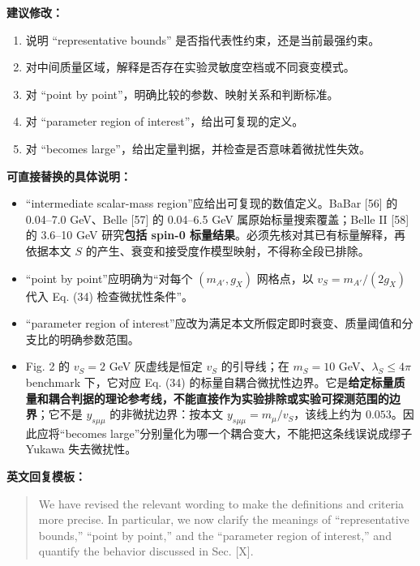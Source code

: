 \documentclass[
  chinese,
  UTF8]{ctexart}
\providecommand{\tightlist}{%
  \setlength{\itemsep}{0pt}\setlength{\parskip}{0pt}}
\begin{document}
\textbf{建议修改：}

\begin{enumerate}
\def\labelenumi{\arabic{enumi}.}
\tightlist
\item
  说明 ``representative bounds'' 是否指代表性约束，还是当前最强约束。
\item
  对中间质量区域，解释是否存在实验灵敏度空档或不同衰变模式。
\item
  对 ``point by point''，明确比较的参数、映射关系和判断标准。
\item
  对 ``parameter region of interest''，给出可复现的定义。
\item
  对 ``becomes large''，给出定量判据，并检查是否意味着微扰性失效。
\end{enumerate}

\textbf{可直接替换的具体说明：}

\begin{itemize}
\tightlist
\item
  ``intermediate scalar-mass region''应给出可复现的数值定义。BaBar
  {[}56{]} 的 0.04--7.0 GeV、Belle {[}57{]} 的 0.04--6.5 GeV
  属原始标量搜索覆盖；Belle II {[}58{]} 的 3.6--10 GeV 研究\textbf{包括
  spin-0 标量结果}。必须先核对其已有标量解释，再依据本文 \(S\)
  的产生、衰变和接受度作模型映射，不得称全段已排除。
\item
  ``point by point''应明确为``对每个 \((m_{A'},g_X)\) 网格点，以
  \(v_S=m_{A'}/(2g_X)\) 代入 Eq. (34) 检查微扰性条件''。
\item
  ``parameter region of
  interest''应改为满足本文所假定即时衰变、质量阈值和分支比的明确参数范围。
\item
  Fig. 2 的 \(v_S=2\) GeV 灰虚线是恒定 \(v_S\) 的引导线；在 \(m_S=10\)
  GeV、\(\lambda_S\le4\pi\) benchmark 下，它对应 Eq. (34)
  的标量自耦合微扰性边界。它是\textbf{给定标量质量和耦合判据的理论参考线，不能直接作为实验排除或实验可探测范围的边界}；它不是
  \(y_{s\mu\mu}\) 的非微扰边界：按本文
  \(y_{s\mu\mu}=m_\mu/v_S\)，该线上约为 \(0.053\)。因此应将``becomes
  large''分别量化为哪一个耦合变大，不能把这条线误说成缪子 Yukawa
  失去微扰性。
\end{itemize}

\textbf{英文回复模板：}

\begin{quote}
We have revised the relevant wording to make the definitions and
criteria more precise. In particular, we now clarify the meanings of
``representative bounds,'' ``point by point,'' and the ``parameter
region of interest,'' and quantify the behavior discussed in Sec.
{[}X{]}.
\end{quote}
\end{document}
